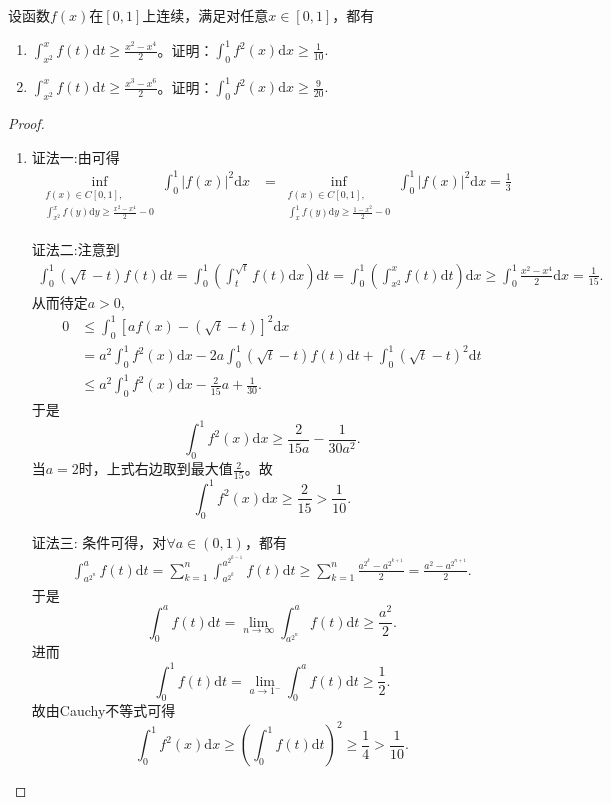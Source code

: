 \documentclass[../../main.tex]{subfiles}
\begin{document}
\begin{example}
设函数$f(x)$在$[0,1]$上连续，满足对任意$x \in [0,1]$，都有
\begin{enumerate}
\item $\int_{x^2}^{x} f(t)\mathrm{d}t \geqslant \frac{x^2 - x^4}{2}$。证明：$\int_{0}^{1} f^2(x)\mathrm{d}x \geqslant  \frac{1}{10}.$

\item $\int_{x^2}^{x} f(t)\mathrm{d}t \geqslant  \frac{x^3 - x^6}{2}$。证明：$\int_{0}^{1} f^2(x)\mathrm{d}x \geqslant  \frac{9}{20}.$
\end{enumerate}
\end{example}
\begin{proof}
\begin{enumerate}
\item {\color{blue}证法一:}由可得
\begin{align*}
\inf_{\substack{f(x) \in C[0,1], \\ \int_{x^2}^x f(y) \mathrm{d}y \geqslant \frac{x^2 - x^4}{2} - 0}} \int_0^1 |f(x)|^2 \mathrm{d}x &= \inf_{\substack{f(x) \in C[0,1], \\ \int_x^1 f(y) \mathrm{d}y \geqslant \frac{1 - x^2}{2} - 0}} \int_0^1 |f(x)|^2 \mathrm{d}x = \frac{1}{3}
\end{align*}

{\color{blue}证法二:}注意到
\begin{align*}
\int_0^1 \left( \sqrt{t} - t \right) f(t) \mathrm{d}t = \int_0^1 \left( \int_t^{\sqrt{t}} f(t) \mathrm{d}x \right) \mathrm{d}t = \int_0^1 \left( \int_{x^2}^x f(t) \mathrm{d}t \right) \mathrm{d}x \geqslant \int_0^1 \frac{x^2 - x^4}{2} \mathrm{d}x = \frac{1}{15}.
\end{align*}
从而待定$a > 0$,
\begin{align*}
0 &\leqslant \int_0^1 \left[ a f(x) - \left( \sqrt{t} - t \right) \right]^2 \mathrm{d}x \\
&= a^2 \int_0^1 f^2(x) \mathrm{d}x - 2a \int_0^1 \left( \sqrt{t} - t \right) f(t) \mathrm{d}t + \int_0^1 \left( \sqrt{t} - t \right)^2 \mathrm{d}t \\
&\leqslant a^2 \int_0^1 f^2(x) \mathrm{d}x - \frac{2}{15}a + \frac{1}{30}.
\end{align*}
于是
\[
\int_0^1 f^2(x) \mathrm{d}x \geqslant \frac{2}{15a} - \frac{1}{30a^2}.
\]
当$a = 2$时，上式右边取到最大值$\frac{2}{15}$。故
\[
\int_0^1 f^2(x) \mathrm{d}x \geqslant \frac{2}{15} > \frac{1}{10}.
\]

{\color{blue}证法三:}
条件可得，对$\forall a \in (0,1)$，都有
\begin{align*}
\int_{a^{2^n}}^a f(t) \mathrm{d}t = \sum_{k=1}^n \int_{a^{2^k}}^{a^{2^{k-1}}} f(t) \mathrm{d}t \geqslant \sum_{k=1}^n \frac{a^{2^k} - a^{2^{k+1}}}{2} = \frac{a^2 - a^{2^{n+1}}}{2}.
\end{align*}
于是
\[
\int_0^a f(t) \mathrm{d}t = \lim_{n \to \infty} \int_{a^{2^n}}^a f(t) \mathrm{d}t \geqslant \frac{a^2}{2}.
\]
进而
\[
\int_0^1 f(t) \mathrm{d}t = \lim_{a \to 1^-} \int_0^a f(t) \mathrm{d}t \geqslant \frac{1}{2}.
\]
故由Cauchy不等式可得
\[
\int_0^1 f^2(x) \mathrm{d}x \geqslant \left( \int_0^1 f(t) \mathrm{d}t \right)^2 \geqslant \frac{1}{4} > \frac{1}{10}.
\]


\end{enumerate}
\end{proof}
\end{document}
